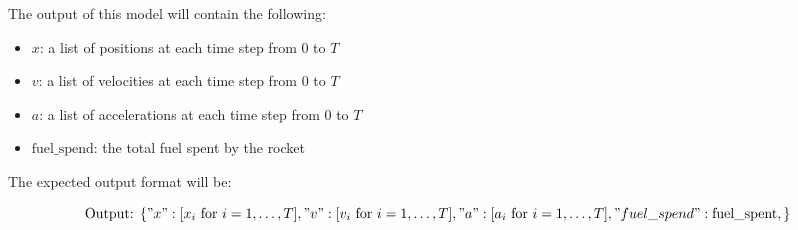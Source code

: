 \documentclass{article}
\begin{document}
The output of this model will contain the following:

\begin{itemize}
    \item \( x \): a list of positions at each time step from 0 to \( T \)
    \item \( v \): a list of velocities at each time step from 0 to \( T \)
    \item \( a \): a list of accelerations at each time step from 0 to \( T \)
    \item \( \text{fuel\_spend} \): the total fuel spent by the rocket
\end{itemize}

The expected output format will be:

\[
\text{Output: } \{
    "x": [x_i \text{ for } i = 1, \ldots, T],
    "v": [v_i \text{ for } i = 1, \ldots, T],
    "a": [a_i \text{ for } i = 1, \ldots, T],
    "fuel\_spend": \text{fuel\_spent},
\}
\]
\end{document}
